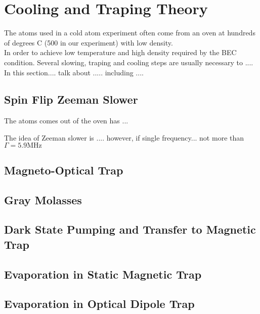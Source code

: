\section{Cooling and Traping Theory}
The atoms used in a cold atom experiment often come from an oven at hundreds of degrees C (500 in our experiment) with low density.\\
In order to achieve low temperature and high density required by the BEC condition. Several slowing, traping and cooling steps are usually necessary to ....\\
In this section.... talk about ..... including ....\\

\subsection{Spin Flip Zeeman Slower}

The atoms comes out of the oven has ...\\

The idea of Zeeman slower is .... however, if single frequency... not more than $\Gamma=5.9\text{MHz}$


\subsection{Magneto-Optical Trap}

\subsection{Gray Molasses}

\subsection{Dark State Pumping and Transfer to Magnetic Trap}

\subsection{Evaporation in Static Magnetic Trap}

\subsection{Evaporation in Optical Dipole Trap}
